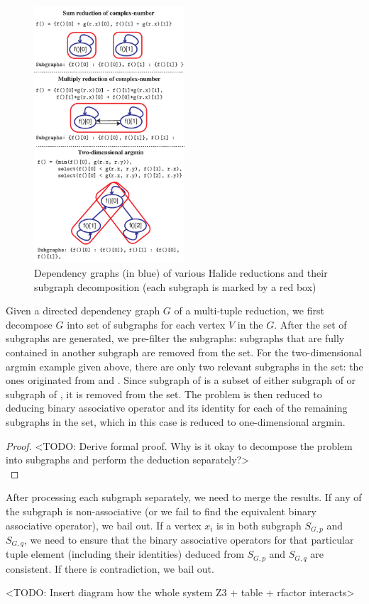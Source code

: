 \begin{figure}
\centering
\label{fig:subgraphs}
\includegraphics[width=0.5\textwidth]{subgraphs}
\caption{Dependency graphs (in blue) of various Halide reductions and their subgraph decomposition (each subgraph is marked by a red box)}
\end{figure}

Given a directed dependency graph $G$ of a multi-tuple reduction, we first decompose $G$ into set of subgraphs for each vertex $V$ in the $G$. After the set of subgraphs are generated, we pre-filter the subgraphs: subgraphs that are fully contained in another subgraph are removed from the set. For the two-dimensional argmin example given above, there are only two relevant subgraphs in the set: the ones originated from  and . Since subgraph of  is a subset of either subgraph of  or subgraph of , it is removed from the set. The problem is then reduced to deducing binary associative operator and its identity for each of the remaining subgraphs in the set, which in this case is reduced to one-dimensional argmin. 

\begin{proof}
<TODO: Derive formal proof. Why is it okay to decompose the problem into subgraphs and perform the deduction separately?> \\
\end{proof}

After processing each subgraph separately, we need to merge the results. If any of the subgraph is non-associative (or we fail to find the equivalent binary associative operator), we bail out. If a vertex $x_i$ is in both subgraph $S_{G, p}$ and $S_{G, q}$, we need to ensure that the binary associative operators for that particular tuple element (including their identities) deduced from $S_{G, p}$ and $S_{G, q}$ are consistent. If there is contradiction, we bail out.  

<TODO: Insert diagram how the whole system Z3 + table + rfactor interacts>